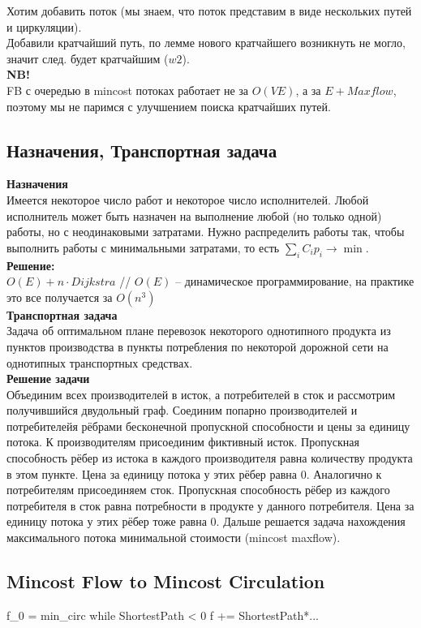 Хотим добавить поток (мы знаем, что поток представим в виде нескольких путей и циркуляции).\\
Добавили кратчайший путь, по лемме нового кратчайшего возникнуть не могло, значит след. будет кратчайшим ($w2$).\\
{\bfseries NB!}\\
FB с очередью в mincost потоках работает не за $O(VE)$, а за $E + Maxflow$, поэтому мы не паримся с улучшением поиска кратчайших путей.\\

\subsection{Назначения, Транспортная задача}
{\bfseries Назначения} \\
Имеется некоторое число работ и некоторое число исполнителей. Любой исполнитель может быть назначен на выполнение любой (но только одной) работы, но с неодинаковыми затратами. 
Нужно распределить работы так, чтобы выполнить работы с минимальными затратами, то есть $\sum_i C_ip_i \to \min$.\\
{\bfseries Решение:}\\
$O(E) + n\cdot Dijkstra$ // $O(E)$ -- динамическое программирование, на практике это все получается за $O(n^3)$\\

{\bfseries Транспортная задача} \\
Задача об оптимальном плане перевозок некоторого однотипного продукта из пунктов производства в пункты потребления по некоторой дорожной сети на однотипных транспортных средствах.\\
{\bfseries Решение задачи}\\
Объединим всех производителей в исток, а потребителей в сток и рассмотрим получившийся двудольный граф. Соединим попарно производителей и потребителейя рёбрами бесконечной пропускной способности 
и цены за единицу потока. К производителям присоединим фиктивный исток. Пропускная способность рёбер из истока в каждого производителя равна количеству продукта в этом пункте. Цена за единицу потока 
у этих рёбер равна 0. Аналогично к потребителям присоединяем сток. Пропускная способность рёбер из каждого потребителя в сток равна потребности в продукте у данного потребителя. Цена за единицу потока 
у этих рёбер тоже равна 0. Дальше решается задача нахождения максимального потока минимальной стоимости (mincost maxflow).

\subsection{Mincost Flow to Mincost Circulation}
\begin{cppcode}
	f_0 = min_circ
	while ShortestPath < 0
		f += ShortestPath*...
\end{cppcode}

